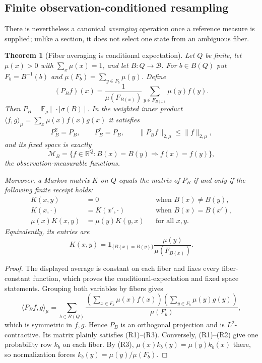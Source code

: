 \documentclass[11pt]{article}
\newtheorem{theorem}{Theorem}[section]
\theoremstyle{definition}
\theoremstyle{remark}
\numberwithin{equation}{section}
\newcommand{\cB}{\mathcal B}
\begin{document}
\subsection{Finite observation-conditioned resampling}

There is nevertheless a canonical \emph{averaging} operation once a reference
measure is supplied; unlike a section, it does not select one state from an
ambiguous fiber.

\begin{theorem}[Fiber averaging is conditional expectation]
\label{thm:fiber-conditional-expectation}
Let $Q$ be finite, let $\mu(x)>0$ with $\sum_x\mu(x)=1$, and let
$B:Q\to\cB$.  For $b\in B(Q)$ put
$F_b=B^{-1}(b)$ and $\mu(F_b)=\sum_{y\in F_b}\mu(y)$.  Define
\[
 (P_Bf)(x)
 =\frac{1}{\mu(F_{B(x)})}
   \sum_{y\in F_{B(x)}}\mu(y)f(y).
 \]
Then $P_B=\mathbb E_\mu[\,\cdot\mid\sigma(B)]$.  In the weighted inner
product $\langle f,g\rangle_\mu=\sum_x\mu(x)f(x)g(x)$ it satisfies
\[
 P_B^2=P_B,\qquad P_B^*=P_B,\qquad
 \|P_Bf\|_{2,\mu}\le\|f\|_{2,\mu},
\]
and its fixed space is exactly
\[
 \mathcal M_B=\{f\in\mathbb R^Q:B(x)=B(y)\Rightarrow f(x)=f(y)\},
\]
the observation-measurable functions.

Moreover, a Markov matrix $K$ on $Q$ equals the matrix of $P_B$ if and only
if the following finite receipt holds:
\begin{align*}
 K(x,y)&=0 &&\text{when }B(x)\ne B(y),\tag{R1}\\
 K(x,\cdot)&=K(x',\cdot)&&\text{when }B(x)=B(x'),\tag{R2}\\
 \mu(x)K(x,y)&=\mu(y)K(y,x)&&\text{for all }x,y.\tag{R3}
\end{align*}
Equivalently, its entries are
\[
 K(x,y)=\mathbf1_{\{B(x)=B(y)\}}
 \frac{\mu(y)}{\mu(F_{B(x)})}.
\]
\end{theorem}

\begin{proof}
The displayed average is constant on each fiber and fixes every
fiber-constant function, which proves the conditional-expectation and fixed
space statements.  Grouping both variables by fibers gives
\[
 \langle P_Bf,g\rangle_\mu
 =\sum_{b\in B(Q)}
 \frac{(\sum_{x\in F_b}\mu(x)f(x))
       (\sum_{y\in F_b}\mu(y)g(y))}{\mu(F_b)},
\]
which is symmetric in $f,g$.  Hence $P_B$ is an orthogonal projection and is
$L^2$-contractive.  Its matrix plainly satisfies (R1)--(R3).  Conversely,
(R1)--(R2) give one probability row $k_b$ on each fiber.  By (R3),
$\mu(x)k_b(y)=\mu(y)k_b(x)$ there, so normalization forces
$k_b(y)=\mu(y)/\mu(F_b)$.
\end{proof}
\end{document}

